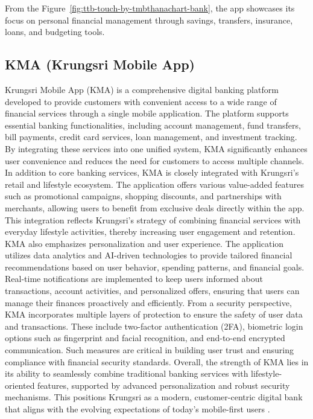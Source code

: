 \documentclass[12pt,oneside,openright,a4paper]{cpe-english-project}
\begin{document}
From the Figure~\ref{fig:ttb-touch-by-tmbthanachart-bank}, the app showcases its focus on personal financial
management through savings, transfers, insurance, loans, and budgeting
tools.

\subsection{KMA (Krungsri Mobile App)}

Krungsri Mobile App (KMA) is a comprehensive digital banking platform developed to provide customers with convenient access to a wide range of financial services through a single mobile application. The platform supports essential banking functionalities, including account management, fund transfers, bill payments, credit card services, loan management, and investment tracking. By integrating these services into one unified system, KMA significantly enhances user convenience and reduces the need for customers to access multiple channels.
In addition to core banking services, KMA is closely integrated with Krungsri’s retail and lifestyle ecosystem. The application offers various value-added features such as promotional campaigns, shopping discounts, and partnerships with merchants, allowing users to benefit from exclusive deals directly within the app. This integration reflects Krungsri’s strategy of combining financial services with everyday lifestyle activities, thereby increasing user engagement and retention.
KMA also emphasizes personalization and user experience. The application utilizes data analytics and AI-driven technologies to provide tailored financial recommendations based on user behavior, spending patterns, and financial goals. Real-time notifications are implemented to keep users informed about transactions, account activities, and personalized offers, ensuring that users can manage their finances proactively and efficiently.
From a security perspective, KMA incorporates multiple layers of protection to ensure the safety of user data and transactions. These include two-factor authentication (2FA), biometric login options such as fingerprint and facial recognition, and end-to-end encrypted communication. Such measures are critical in building user trust and ensuring compliance with financial security standards.
Overall, the strength of KMA lies in its ability to seamlessly combine traditional banking services with lifestyle-oriented features, supported by advanced personalization and robust security mechanisms. This positions Krungsri as a modern, customer-centric digital bank that aligns with the evolving expectations of today’s mobile-first users \cite{techsauce_krungsri}.
\end{document}
